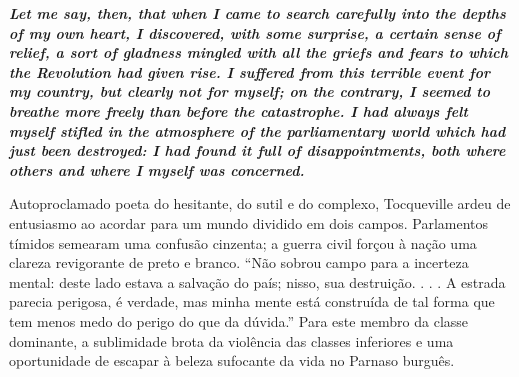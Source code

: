 \par
 

 \textbf{\textit{Let me say, then, that when I came to search carefully into the depths of my own heart, I discovered, with some surprise, a certain sense of relief, a sort of gladness mingled with all the griefs and fears to which the Revolution had given rise. I suffered from this terrible event for my country, but clearly not for myself; on the contrary, I seemed to breathe more freely than before the catastrophe. I had always felt myself stifled in the atmosphere of the parliamentary world which had just been destroyed: I had found it full of disappointments, both where others and where I myself was concerned.} }  
 
 
\par
 
Autoproclamado poeta do hesitante, do sutil e do complexo, Tocqueville ardeu de entusiasmo ao acordar para um mundo dividido em dois campos. Parlamentos tímidos semearam uma confusão cinzenta; a guerra civil forçou à nação uma clareza revigorante de preto e branco. “Não sobrou campo para a incerteza mental: deste lado estava a salvação do país; nisso, sua destruição. . . . A estrada parecia perigosa, é verdade, mas minha mente está construída de tal forma que tem menos medo do perigo do que da dúvida.” Para este membro da classe dominante, a sublimidade brota da violência das classes inferiores e uma oportunidade de escapar à beleza sufocante da vida no Parnaso burguês.
 
\par
 
